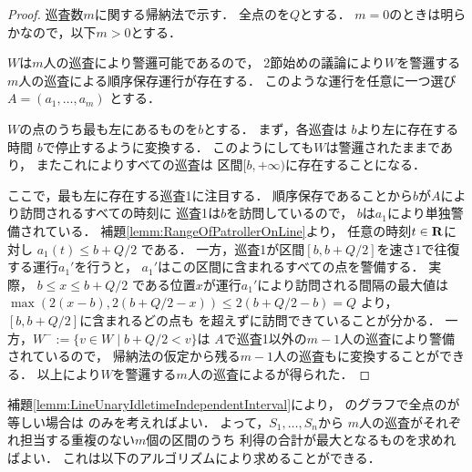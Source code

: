 \begin{proof}
  \newcommand{\leftmostpoint}{b}  %
  \newcommand{\leftmostpatroller}{巡査1}

  巡査数$m$に関する帰納法で示す．
  全点の{\maxIdletime}を$Q$とする．
  $m = 0$のときは明らかなので，以下$m > 0$とする．

  $W$は$m$人の巡査により警邏可能であるので，
  2節始めの議論により$W$を警邏する$m$人の巡査による順序保存運行が存在する．
  このような運行を任意に一つ選び
  $A = (a_1, \ldots, a_m)$
  とする．

  $W$の点のうち最も左にあるものを$\leftmostpoint$とする．
  まず，各巡査は
  $\leftmostpoint$より左に存在する時間
  $\leftmostpoint$で停止するように変換する．
  このようにしても$W$は警邏されたままであり，
  またこれによりすべての巡査は
  区間$[\leftmostpoint, +\infty)$に存在することになる．

  ここで，最も左に存在する{\leftmostpatroller}に注目する．
  順序保存であることから$\leftmostpoint$が$A$により訪問されるすべての時刻に
  {\leftmostpatroller}は$\leftmostpoint$を訪問しているので，
  $\leftmostpoint$は$a_1$により単独警備されている．
  補題\ref{lemm:RangeOfPatrollerOnLine}より，
  任意の時刻$t \in \mathbf R$に対し
  $a_1(t) \leq \leftmostpoint + Q/2$
  である．
  一方，{\leftmostpatroller}が区間$[\leftmostpoint, \leftmostpoint + Q/2]$を速さ$1$で往復する運行$a_1'$を行うと，
  $a_1'$はこの区間に含まれるすべての点を警備する．
  実際，
  $\leftmostpoint \leq x \leq \leftmostpoint + Q/2$
  である位置$x$が運行$a_1'$により訪問される間隔の最大値は
  $ \max( 2(x - \leftmostpoint), 2(\leftmostpoint + Q/2 - x) )
    \leq 2(\leftmostpoint + Q/2 - \leftmostpoint) = Q $
  より，$[\leftmostpoint, \leftmostpoint + Q/2]$に含まれるどの点も
  {\maxIdletime}を超えずに訪問できていることが分かる．
  一方，$W^- := \{ v \in W \mid \leftmostpoint + Q/2 < v \}$は
  $A$で{\leftmostpatroller}以外の$m - 1$人の巡査により警備されているので，
  帰納法の仮定から残る$m - 1$人の巡査も{\indSectOperation}に変換することができる．
  以上により$W$を警邏する$m$人の巡査による{\indSectOperation}が得られた．
\end{proof}


補題\ref{lemm:LineUnaryIdletimeIndependentInterval}により，
{\graphLine}のグラフで全点の{\maxIdletime}が等しい場合は
{\indSectOperation}のみを考えればよい．
よって，$S_1, \ldots, S_n$から
$m$人の巡査がそれぞれ担当する重複のない$m$個の区間のうち
利得の合計が最大となるものを求めればよい．
これは以下のアルゴリズムにより求めることができる．

